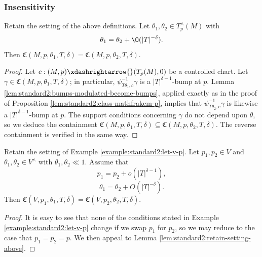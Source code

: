 \subsubsection{Insensitivity}


\begin{lemma}\label{lem:standard2:retain-setting-above}
  Retain the setting of the above definitions.  Let $\theta_1, \theta_2 \in T_p^\wedge(M)$ with
  \begin{equation*}
    \theta_1 = \theta_2 + \O(|T|^{-\delta}).
  \end{equation*}
  Then $\mathfrak{C}(M,p,\theta_1,T,\delta) = \mathfrak{C}(M,p,\theta_2,T,\delta)$.
\end{lemma}
\begin{proof}
  Let $c : (M, p) \xdashrightarrow{} (T_p(M), 0)$ be a controlled chart.  Let $\gamma \in \mathfrak{C}(M,p,\theta_1,T,\delta)$; in particular, $\psi_{T \theta_1, c}^{-1} \gamma$ is a $|T|^{\delta-1}$-bump at $p$.  Lemma \ref{lem:standard2:bumps-modulated-become-bumps}, applied exactly as in the proof of Proposition \ref{lem:standard2:class-mathfrakcm-p}, implies that $\psi_{T \theta_2, c}^{-1} \gamma$ is likewise a $|T|^{\delta-1}$-bump at $p$.  The support conditions concerning $\gamma$ do not depend upon $\theta$, so we deduce the containment $\mathfrak{C}(M,p,\theta_1,T,\delta) \subseteq \mathfrak{C}(M,p,\theta_2,T,\delta)$.  The reverse containment is verified in the same way.
\end{proof}

\begin{lemma}\label{lem:insensitivity}
  Retain the setting of Example \ref{example:standard2:let-v-p}.  Let $p_1, p_2 \in V$ and $\theta_1, \theta_2 \in V^\wedge$ with $\theta_1, \theta_2 \ll 1$.  Assume that
  \begin{equation*}
    p_1 = p_2 + o(|T|^{\delta-1}),
  \end{equation*}
  \begin{equation*}
    \theta_1 = \theta_2 + O(|T|^{-\delta}).
  \end{equation*}
  Then $\mathfrak{C}(V,p_1,\theta_1,T,\delta) = \mathfrak{C}(V,p_2,\theta_2,T,\delta)$.
\end{lemma}
\begin{proof}
  It is easy to see that none of the conditions stated in Example  \ref{example:standard2:let-v-p} change if we swap $p_1$ for $p_2$, so we may reduce to the case that $p_1 = p_2 = p$.  We then appeal to Lemma \ref{lem:standard2:retain-setting-above}.
\end{proof}


